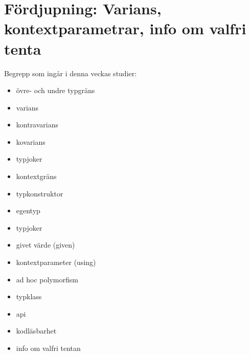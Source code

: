 \chapter{Fördjupning: Varians, kontextparametrar, info om valfri tenta}\label{chapter:W11}
Begrepp som ingår i denna veckas studier:
\begin{itemize}[noitemsep,label={$\square$},leftmargin=*]
\item övre- och undre typgräns
\item varians
\item kontravarians
\item kovarians
\item typjoker
\item kontextgräns
\item typkonstruktor
\item egentyp
\item typjoker
\item givet värde (given)
\item kontextparameter (using)
\item ad hoc polymorfism
\item typklass
\item api
\item kodläsbarhet
\item info om valfri tentan\end{itemize}
